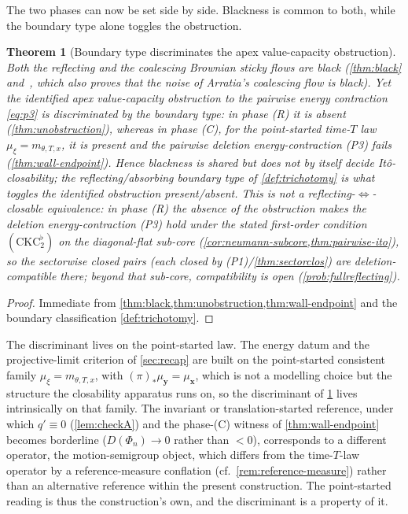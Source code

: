 \documentclass[reqno,final,11pt]{amsart}
\theoremstyle{plain}
\newtheorem{theorem}{Theorem}[section]
\theoremstyle{definition}
\theoremstyle{remark}
\begin{document}
The two phases can now be set side by side. Blackness is common to both, while
the boundary type alone toggles the obstruction.

\begin{theorem}[Boundary type discriminates the apex value-capacity obstruction]\label{thm:discriminant}
Both the reflecting and the coalescing Brownian sticky flows are black
(\cref{thm:black} and~\citep{LJR-circle-noise}, which also proves that the noise of
Arratia's coalescing flow is black). Yet the identified apex value-capacity
obstruction to the pairwise energy contraction \eqref{eq:p3} is discriminated by
the boundary type: in phase \textnormal{(R)} it is absent
(\cref{thm:unobstruction}), whereas in phase \textnormal{(C)}, for the
point-started time-$T$ law $\mu_\xi=m_{\theta,T,x}$, it is present and
the pairwise deletion energy-contraction (P3) fails
(\cref{thm:wall-endpoint}). Hence blackness is
shared but does not by itself decide It\^o-closability; the
reflecting/absorbing boundary type of \cref{def:trichotomy} is what toggles the
identified obstruction present/absent. This is not a reflecting-$\Leftrightarrow$-closable
equivalence: in phase \textnormal{(R)} the absence of the obstruction makes the
deletion energy-contraction (P3) hold under the stated first-order condition
$(\mathrm{CKC}_2^{\flat})$ on the diagonal-flat sub-core
(\cref{cor:neumann-subcore,thm:pairwise-ito}), so the sectorwise closed pairs
(each closed by (P1)/\cref{thm:sectorclos}) are deletion-compatible there; beyond
that sub-core, compatibility is open (\cref{prob:fullreflecting}).
\end{theorem}
\begin{proof}
Immediate from \cref{thm:black,thm:unobstruction,thm:wall-endpoint} and the
boundary classification \cref{def:trichotomy}.
\end{proof}

The discriminant lives on the point-started law. The energy datum and the
projective-limit criterion of \cref{sec:recap} are built on the point-started
consistent family $\mu_\xi=m_{\theta,T,x}$, with
$(\pi)_*\mu_{\mathbf y}=\mu_{\mathbf x}$, which is not a modelling choice but the
structure the closability apparatus runs on, so the discriminant of
\cref{thm:discriminant} lives intrinsically on that family. The invariant or
translation-started reference, under which $q'\equiv0$ (\cref{lem:checkA}) and the
phase-\textnormal{(C)} witness of \cref{thm:wall-endpoint} becomes borderline
($D(\Phi_n)\to0$ rather than $<0$), corresponds to a different operator,
the motion-semigroup object, which differs from the time-$T$-law operator by a
reference-measure conflation (cf.~\cref{rem:reference-measure}) rather than an
alternative reference within the present construction. The point-started reading
is thus the construction's own, and the discriminant is a property of it.
\end{document}
